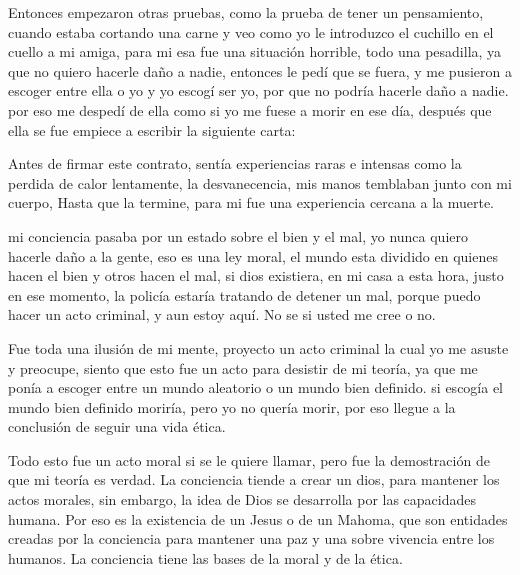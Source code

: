 \documentclass[12pt,letterpaper, a4paper ]{article}
\begin{document}
Entonces empezaron otras pruebas, como la prueba de tener un pensamiento, cuando estaba cortando una carne y veo como yo le introduzco  el cuchillo en el cuello a mi amiga, para mi esa fue una situación horrible, todo una pesadilla, ya que no quiero hacerle daño a nadie, entonces le pedí que se fuera, y me pusieron a escoger entre ella o yo y yo escogí ser yo, por que no podría hacerle daño a nadie. por eso me despedí de ella como si yo me fuese a morir en ese día, después que ella se fue empiece a escribir la siguiente carta:



Antes de firmar este contrato, sentía experiencias raras e intensas como la perdida de calor lentamente, la desvanecencia, mis manos temblaban junto con mi cuerpo, Hasta que la termine, para mi fue una experiencia cercana a la muerte.

mi conciencia pasaba por un estado sobre el bien y el mal, yo nunca quiero hacerle daño a la gente, eso es una ley moral, el mundo esta dividido en quienes hacen el bien y otros hacen el mal, si dios existiera, en mi casa a esta hora, justo en ese momento, la policía estaría tratando de detener un mal, porque puedo hacer un acto criminal, y aun estoy aquí. No se si usted me cree o no.

Fue toda una ilusión de mi mente, proyecto un acto criminal la cual yo me asuste y preocupe, siento que esto fue un acto para desistir de mi teoría, ya que me ponía a escoger entre un mundo aleatorio o un mundo bien definido. si escogía el mundo bien definido moriría, pero yo no quería morir, por eso llegue a la conclusión de seguir una vida ética. 

Todo esto fue un acto moral si se le quiere llamar, pero fue la demostración de que mi teoría es verdad. La conciencia tiende a crear un dios, para mantener los actos morales, sin embargo, la idea de Dios se desarrolla por las capacidades humana. Por eso es la existencia de un Jesus o de un Mahoma, que son entidades creadas por la conciencia para mantener una paz y una sobre vivencia entre los humanos. La conciencia tiene las bases de la moral y de la ética.
\end{document}
